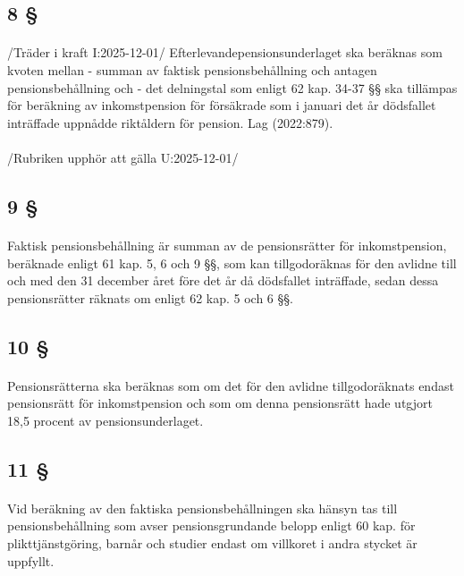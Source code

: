 \documentclass[a4paper,notitlepage,openany,10pt]{book}
\begin{document}
\subsection*{8 §}
\paragraph*{}
/Träder i kraft I:2025-12-01/
Efterlevandepensionsunderlaget ska beräknas som kvoten mellan
\newline - summan av faktisk pensionsbehållning och antagen pensionsbehållning och
\newline - det delningstal som enligt 62 kap. 34-37 §§ ska tillämpas för beräkning av inkomstpension för försäkrade som i januari det år dödsfallet inträffade uppnådde riktåldern för pension.
Lag (2022:879).
\paragraph*{}
/Rubriken upphör att gälla U:2025-12-01/
\subsection*{9 §}
\paragraph*{}
Faktisk pensionsbehållning är summan av de pensionsrätter för inkomstpension, beräknade enligt 61 kap. 5, 6 och 9 §§, som kan tillgodoräknas för den avlidne till och med den 31 december året före det år då dödsfallet inträffade, sedan dessa pensionsrätter räknats om enligt 62 kap. 5 och 6 §§.
\subsection*{10 §}
\paragraph*{}
Pensionsrätterna ska beräknas som om det för den avlidne tillgodoräknats endast pensionsrätt för inkomstpension och som om denna pensionsrätt hade utgjort 18,5 procent av pensionsunderlaget.
\subsection*{11 §}
\paragraph*{}
Vid beräkning av den faktiska pensionsbehållningen ska hänsyn tas till pensionsbehållning som avser pensionsgrundande belopp enligt 60 kap. för plikttjänstgöring, barnår och studier endast om villkoret i andra stycket är uppfyllt.
\end{document}
